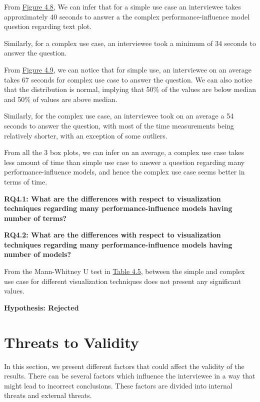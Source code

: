 \begin{description}[leftmargin=0pt]
\begin{description}[leftmargin=0pt]
\item[Text Plot: ]From \hyperref[scalabilityText]{Figure 4.8}, We can infer that for a simple use case an interviewee takes approximately 40 seconds to answer a the complex performance-influence model question regarding text plot. 

Similarly, for a complex use case, an interviewee took a minimum of 34 seconds to answer the question.

\item[Ratio Plot: ]From \hyperref[scalabilityRatio]{Figure 4.9}, we can notice that for simple use, an interviewee on an average takes 67 seconds for complex use case to answer the question. We can also notice that the distribution is normal, implying that 50\% of the values are below median and 50\% of values are above median. 

Similarly, for the complex use case, an interviewee took on an average a 54 seconds to answer the question, with most of the time measurements being relatively shorter, with an exception of some outliers.
\end{description}

From all the 3 box plots, we can infer on an average, a complex use case takes less amount of time than simple use case to answer a question regarding many performance-influence models, and hence the complex use case seems better in terms of time.

\begin{mdframed}
\textbf{RQ4.1: What are the differences with respect to visualization techniques regarding many performance-influence models having number of terms?}
\end{mdframed}

\begin{mdframed}
\textbf{RQ4.2: What are the differences with respect to visualization techniques regarding many performance-influence models having number of models?}
\end{mdframed}

From the Mann-Whitney U test in \hyperref[table:q5q6MannWhitney]{Table 4.5}, between the simple and complex use case for different visualization techniques does not present any significant values.

\begin{mdframed}
\textbf {Hypothesis: Rejected}
\end{mdframed}
\end{description}

\section{Threats to Validity}
\label{sec:4.5}
In this section, we present different factors that could affect the validity of the results. There can be several factors which influence the interviewee in a way that might lead to incorrect conclusions. These factors are divided into internal threats and external threats.

